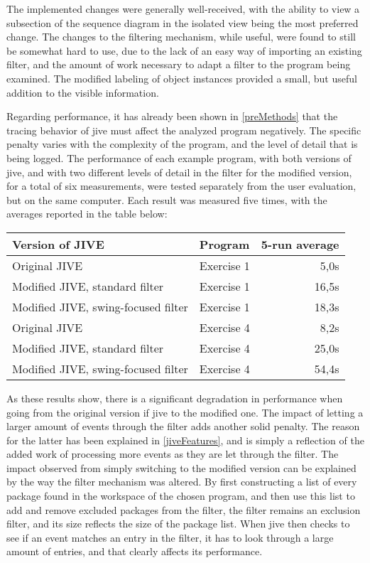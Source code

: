 The implemented changes were generally well-received, with the ability to view a subsection of the sequence diagram in the isolated view being the most preferred change.
The changes to the filtering mechanism, while useful, were found to still be somewhat hard to use, due to the lack of an easy way of importing an existing filter, and the amount of work necessary to adapt a filter to the program being examined.
The modified labeling of object instances provided a small, but useful addition to the visible information.

Regarding performance, it has already been shown in \autoref{preMethods} that the tracing behavior of \gls{jive} must affect the analyzed program negatively.
The specific penalty varies with the complexity of the program, and the level of detail that is being logged.
The performance of each example program, with both versions of \gls{jive}, and with two different levels of detail in the filter for the modified version, for a total of six measurements, were tested separately from the user evaluation, but on the same computer.
Each result was measured five times, with the averages reported in the table below:

\begin{center}
	\begin{tabular}{|l|l|r|}
		\hline
		Version of JIVE & Program & 5-run average\\ \hline
		Original JIVE & Exercise 1 & 5,0s\\ \hline	
		Modified JIVE, standard filter & Exercise 1 & 16,5s\\ \hline	
		Modified JIVE, swing-focused filter & Exercise 1 & 18,3s\\ \hline
		Original JIVE & Exercise 4 & 8,2s\\ \hline	
		Modified JIVE, standard filter & Exercise 4 & 25,0s\\ \hline	
		Modified JIVE, swing-focused filter & Exercise 4 & 54,4s\\ \hline
	\end{tabular}
\end{center}

As these results show, there is a significant degradation in performance when going from the original version if \gls{jive} to the modified one.
The impact of letting a larger amount of events through the filter adds another solid penalty.
The reason for the latter has been explained in \autoref{jiveFeatures}, and is simply a reflection of the added work of processing more events as they are let through the filter.
The impact observed from simply switching to the modified version can be explained by the way the filter mechanism was altered.
By first constructing a list of every package found in the workspace of the chosen program, and then use this list to add and remove excluded packages from the filter, the filter remains an exclusion filter, and its size reflects the size of the package list.
When \gls{jive} then checks to see if an event matches an entry in the filter, it has to look through a large amount of entries, and that clearly affects its performance.

